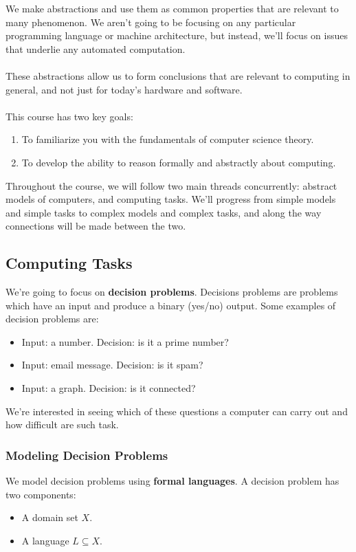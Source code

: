 \documentclass[]{article}
\theoremstyle{definition}
\begin{document}
      We make abstractions and use them as common properties that are relevant to many phenomenon. We aren't going to be focusing on any particular programming language or machine architecture, but instead, we'll focus on issues that underlie any automated computation.
      \\ \\
      These abstractions allow us to form conclusions that are relevant to computing in general, and not just for today's hardware and software.
      \\ \\
      This course has two key goals:
      \begin{enumerate}
        \item To familiarize you with the fundamentals of computer science theory.
        \item To develop the ability to reason formally and abstractly about computing.
      \end{enumerate}

    Throughout the course, we will follow two main threads concurrently: abstract models of computers, and computing tasks. We'll progress from simple models and simple tasks to complex models and complex tasks, and along the way connections will be made between the two.

    \subsection{Computing Tasks}
      We're going to focus on \textbf{decision problems}. Decisions problems are problems which have an input and produce a binary (yes/no) output. Some examples of decision problems are:
      \begin{itemize}
        \item Input: a number. Decision: is it a prime number?
        \item Input: email message. Decision: is it spam?
        \item Input: a graph. Decision: is it connected?
      \end{itemize}

      We're interested in seeing which of these questions a computer can carry out and how difficult are such task.

      \subsubsection{Modeling Decision Problems}
        We model decision problems using \textbf{formal languages}. A decision problem has two components:
        \begin{itemize}
          \item A domain set $X$.
          \item A language $L \subseteq X$.
        \end{itemize}
\end{document}
